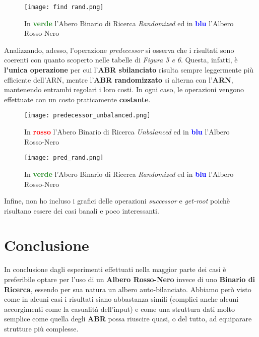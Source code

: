 \documentclass{article}
\begin{document}
\begin{figure}[!ht]
        \centering
        \texttt{[image: find rand.png]}
        \caption{In \textbf{\textcolor{ForestGreen}{verde}} l'Abero Binario di Ricerca \textit{Randomized} ed in \textbf{\textcolor{blue}{blu}} l'Albero Rosso-Nero}
        \label{fig:search_rand}
\end{figure}

\clearpage

Analizzando, adesso, l'operazione \textit{predecessor} si osserva che i risultati sono coerenti con quanto scoperto nelle tabelle di \textit{Figura 5 e 6}. Questa, infatti, è \textbf{l'unica operazione} per cui l'\textbf{ABR sbilanciato} risulta sempre leggermente più efficiente dell'ARN, mentre l'\textbf{ABR randomizzato} si alterna con l'\textbf{ARN}, mantenendo entrambi regolari i loro costi.
In ogni caso, le operazioni vengono effettuate con un costo praticamente \textbf{costante}.
\begin{figure}[!hb]
        \centering
        \texttt{[image: predecessor\_unbalanced.png]}
        \caption{In \textbf{\textcolor{red}{rosso}} l'Abero Binario di Ricerca \textit{Unbalanced} ed in \textbf{\textcolor{blue}{blu}} l'Albero Rosso-Nero}
        \label{fig:balanced_search}
\end{figure}

\begin{figure}[!hb]
        \centering
        \texttt{[image: pred\_rand.png]}
        \caption{In \textbf{\textcolor{ForestGreen}{verde}} l'Abero Binario di Ricerca \textit{Randomized} ed in \textbf{\textcolor{blue}{blu}} l'Albero Rosso-Nero}
        \label{fig:search_rand}
\end{figure}

Infine, non ho incluso i grafici delle operazioni \textit{successor} e \textit{get-root} poichè risultano essere dei casi banali e poco interessanti.

\section{Conclusione}
In conclusione dagli esperimenti effettuati nella maggior parte dei casi è preferibile optare per l’uso di un \textbf{Albero Rosso-Nero} invece di uno \textbf{Binario di Ricerca}, essendo per sua natura un albero auto-bilanciato.
Abbiamo però visto come in alcuni casi i risultati siano abbastanza simili (complici anche alcuni accorgimenti come la casualità dell'input) e come una struttura dati molto semplice come quella degli \textbf{ABR} possa riuscire quasi, o del tutto, ad equiparare strutture più complesse.
\end{document}
